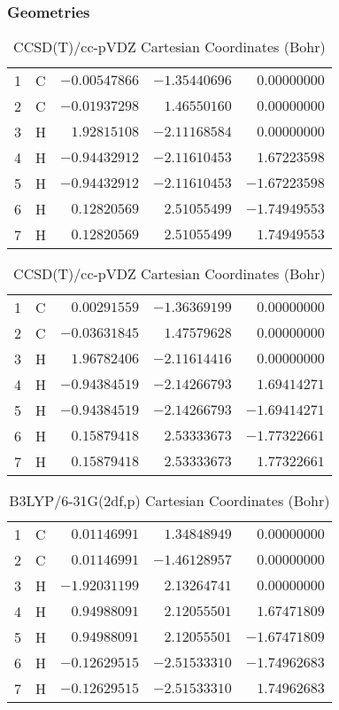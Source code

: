 \documentclass[10pt,oneside]{article}
\begin{document}
\begin{table}[h!]
\subsubsection*{Geometries}
\begin{multicols}{2}
\centering
\caption{CCSD(T)/cc-pVTZ Cartesian Coordinates (Bohr)}
\begin{tabular}{llrrr}
\toprule
1  & C  & $-0.00547866$ & $-1.35440696$ & $ 0.00000000$ \\
2  & C  & $-0.01937298$ & $ 1.46550160$ & $ 0.00000000$ \\
3  & H  & $ 1.92815108$ & $-2.11168584$ & $ 0.00000000$ \\
4  & H  & $-0.94432912$ & $-2.11610453$ & $ 1.67223598$ \\
5  & H  & $-0.94432912$ & $-2.11610453$ & $-1.67223598$ \\
6  & H  & $ 0.12820569$ & $ 2.51055499$ & $-1.74949553$ \\
7  & H  & $ 0.12820569$ & $ 2.51055499$ & $ 1.74949553$ \\
\bottomrule
\end{tabular}
\caption{CCSD(T)/cc-pVDZ Cartesian Coordinates (Bohr)}
\begin{tabular}{llrrr}
\toprule
1  & C  & $ 0.00291559$ & $-1.36369199$ & $ 0.00000000$ \\
2  & C  & $-0.03631845$ & $ 1.47579628$ & $ 0.00000000$ \\
3  & H  & $ 1.96782406$ & $-2.11614416$ & $ 0.00000000$ \\
4  & H  & $-0.94384519$ & $-2.14266793$ & $ 1.69414271$ \\
5  & H  & $-0.94384519$ & $-2.14266793$ & $-1.69414271$ \\
6  & H  & $ 0.15879418$ & $ 2.53333673$ & $-1.77322661$ \\
7  & H  & $ 0.15879418$ & $ 2.53333673$ & $ 1.77322661$ \\
\bottomrule
\end{tabular}
\end{multicols}
\end{table}

\begin{table}[h]
\centering
\caption{B3LYP/6-31G(2df,p) Cartesian Coordinates (Bohr)}
\begin{tabular}{llrrr}
\toprule
1  & C  & $ 0.01146991$ & $ 1.34848949$ & $ 0.00000000$ \\
2  & C  & $ 0.01146991$ & $-1.46128957$ & $ 0.00000000$ \\
3  & H  & $-1.92031199$ & $ 2.13264741$ & $ 0.00000000$ \\
4  & H  & $ 0.94988091$ & $ 2.12055501$ & $ 1.67471809$ \\
5  & H  & $ 0.94988091$ & $ 2.12055501$ & $-1.67471809$ \\
6  & H  & $-0.12629515$ & $-2.51533310$ & $-1.74962683$ \\
7  & H  & $-0.12629515$ & $-2.51533310$ & $ 1.74962683$ \\
\bottomrule
\end{tabular}
\end{table}
\end{document}
